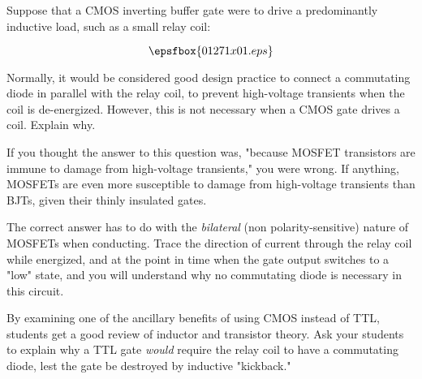 

Suppose that a CMOS inverting buffer gate were to drive a predominantly inductive load, such as a small relay coil:

$$\epsfbox{01271x01.eps}$$

Normally, it would be considered good design practice to connect a commutating diode in parallel with the relay coil, to prevent high-voltage transients when the coil is de-energized.  However, this is not necessary when a CMOS gate drives a coil.  Explain why.







If you thought the answer to this question was, "because MOSFET transistors are immune to damage from high-voltage transients," you were wrong.  If anything, MOSFETs are even more susceptible to damage from high-voltage transients than BJTs, given their thinly insulated gates.  

The correct answer has to do with the {\it bilateral} (non polarity-sensitive) nature of MOSFETs when conducting.  Trace the direction of current through the relay coil while energized, and at the point in time when the gate output switches to a "low" state, and you will understand why no commutating diode is necessary in this circuit.







By examining one of the ancillary benefits of using CMOS instead of TTL, students get a good review of inductor and transistor theory.  Ask your students to explain why a TTL gate {\it would} require the relay coil to have a commutating diode, lest the gate be destroyed by inductive "kickback."




